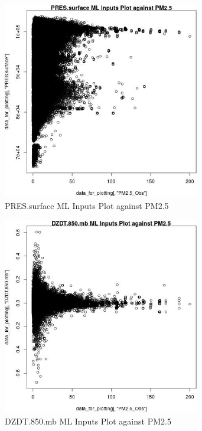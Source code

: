 \begin{figure} 
\centering  
\includegraphics[width=0.77\textwidth]{Code_Outputs/ML_input_report_ML_input_PM25_Step5_part_d_de_duplicated_aves_ML_input_PRESsurfacevPM25_Obs.jpg} 
\caption{\label{fig:ML_input_report_ML_input_PM25_Step5_part_d_de_duplicated_aves_ML_inputPRESsurfacevPM25_Obs}PRES.surface ML Inputs Plot against PM2.5} 
\end{figure} 
 

\begin{figure} 
\centering  
\includegraphics[width=0.77\textwidth]{Code_Outputs/ML_input_report_ML_input_PM25_Step5_part_d_de_duplicated_aves_ML_input_DZDT850mbvPM25_Obs.jpg} 
\caption{\label{fig:ML_input_report_ML_input_PM25_Step5_part_d_de_duplicated_aves_ML_inputDZDT850mbvPM25_Obs}DZDT.850.mb ML Inputs Plot against PM2.5} 
\end{figure} 
 

